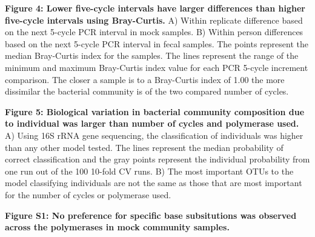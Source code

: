 \documentclass[11pt,]{article}
\begin{document}
\textbf{Figure 4: Lower five-cycle intervals have larger differences
than higher five-cycle intervals using Bray-Curtis.} A) Within replicate
difference based on the next 5-cycle PCR interval in mock samples. B)
Within person differences based on the next 5-cycle PCR interval in
fecal samples. The points represent the median Bray-Curtis index for the
samples. The lines represent the range of the minimum and maximum
Bray-Curtis index value for each PCR 5-cycle increment comparison. The
closer a sample is to a Bray-Curtis index of 1.00 the more dissimilar
the bacterial community is of the two compared number of cycles.

\textbf{Figure 5: Biological variation in bacterial community
composition due to individual was larger than number of cycles and
polymerase used.} A) Using 16S rRNA gene sequencing, the classification
of individuals was higher than any other model tested. The lines
represent the median probability of correct classification and the gray
points represent the individual probability from one run out of the 100
10-fold CV runs. B) The most important OTUs to the model classifying
individuals are not the same as those that are most important for the
number of cycles or polymerase used.

\newpage

\textbf{Figure S1: No preference for specific base subsitutions was
observed across the polymerases in mock community samples.}
\end{document}
